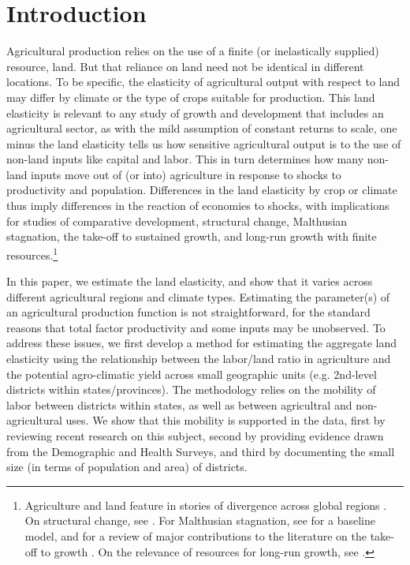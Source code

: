 \documentclass[11pt]{article}
\begin{document}
\pagebreak 

\section{Introduction}
\onehalfspacing 
Agricultural production relies on the use of a finite (or inelastically supplied) resource, land. But that reliance on land need not be identical in different locations. To be specific, the elasticity of agricultural output with respect to land may differ by climate or the type of crops suitable for production. This land elasticity is relevant to any study of growth and development that includes an agricultural sector, as with the mild assumption of constant returns to scale, one minus the land elasticity tells us how sensitive agricultural output is to the use of non-land inputs like capital and labor. This in turn determines how many non-land inputs move out of (or into) agriculture in response to shocks to productivity and population. Differences in the land elasticity by crop or climate thus imply differences in the reaction of economies to shocks, with implications for studies of comparative development, structural change, Malthusian stagnation, the take-off to sustained growth, and long-run growth with finite resources.\footnote{Agriculture and land feature in stories of divergence across global regions \citep{kp2001,galor2008trading,vollrath2011,vv08,vv13,cs2015}. On structural change, see \cite{Gollin:2007oq,Restuccia:2008hc,weilwilde2009,Gollin:2010ys,ev2016clim}. For Malthusian stagnation, see \cite{ashraf2010dynamics} for a baseline model, and \citet{Galor:2011uq} for a review of major contributions to the literature on the take-off to growth \citep{gw00,galor2002natural,Hansen:2002fk,doepke2004accounting,cs2005,lagerlof2006,craftsmills2009,strulik2008population}. On the relevance of resources for long-run growth, see \cite{perettovalente2015}.} 

In this paper, we estimate the land elasticity, and show that it varies across different agricultural regions and climate types. Estimating the parameter(s) of an agricultural production function is not straightforward, for the standard reasons that total factor productivity and some inputs may be unobserved. To address these issues, we first develop a method for estimating the aggregate land elasticity using the relationship between the labor/land ratio in agriculture and the potential agro-climatic yield across small geographic units (e.g. 2nd-level districts within states/provinces). The methodology relies on the mobility of labor between districts within states, as well as between agricultral and non-agricultural uses. We show that this mobility is supported in the data, first by reviewing recent research on this subject, second by providing evidence drawn from the Demographic and Health Surveys, and third by documenting the small size (in terms of population and area) of districts.
\end{document}
